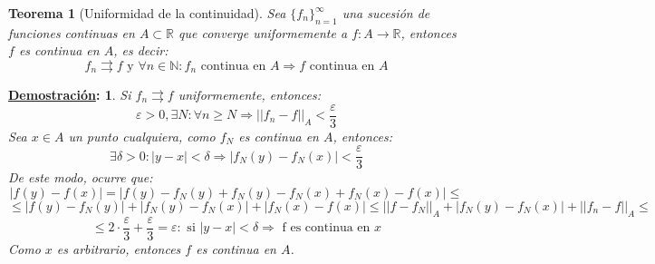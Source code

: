 \documentclass[10pt,a4paper,openright]{book}
\theoremstyle{break}
\newtheorem*{theo}{Teorema}
\newtheorem*{demo}{\underline{Demostración}:}
\begin{document}
\begin{theo}[Uniformidad de la continuidad]
Sea $\{f_n\}_{n=1}^\infty$ una sucesión de funciones continuas en $A \subset \mathbb{R}$ que converge uniformemente a $f: A \to \mathbb{R}$, entonces $f$ es continua en $A$, es decir:
$$f_n\rightrightarrows f \mbox{ y } \forall n \in \mathbb{N} : f_n \mbox{ continua  en } A \Rightarrow f \mbox{ continua en }A$$
\end{theo}
\begin{demo}
Si $f_n \rightrightarrows f$ uniformemente, entonces:
$$\varepsilon > 0, \exists N: \forall n \geq N \Rightarrow ||f_n - f ||_A < \frac{\varepsilon}{3}$$
Sea $x \in A$ un punto cualquiera, como $f_N$ es continua en  $A$, entonces:
$$\exists \delta > 0 : |y-x|<\delta \Rightarrow |f_N (y) - f_N (x)| < \frac{\varepsilon}{3}$$
De este modo, ocurre que:
$$|f (y) - f (x)| = |f (y) - f_N (y) + f_N (y) -f_N (x) + f_N (x) - f(x)| \leq $$
$$\leq |f(y) - f_N (y)| + |f_N (y) - f_N (x)| + |f_N (x) - f(x)| \leq || f - f_N ||_A + |f_N (y) - f_N (x)| + ||f_n - f||_A \leq$$
$$\leq 2 \cdot \frac{\varepsilon}{3} + \frac{\varepsilon}{3}  = \varepsilon : \mbox{ si } |y-x| < \delta \Rightarrow \mbox{ f es continua en } x$$
Como $x$ es arbitrario, entonces $f$ es continua en $A$.
\end{demo}
\end{document}
